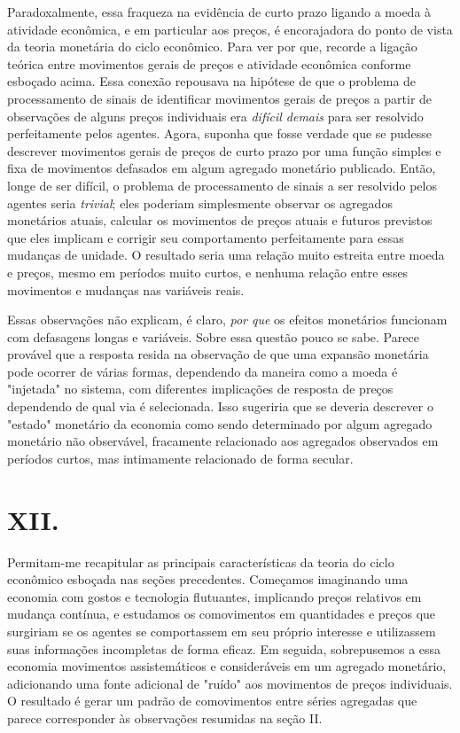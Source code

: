 \documentclass[12pt]{article}
\begin{document}
Paradoxalmente, essa fraqueza na evidência de curto prazo ligando a moeda à atividade econômica, e em particular aos preços, é encorajadora do ponto de vista da teoria monetária do ciclo econômico. Para ver por que, recorde a ligação teórica entre movimentos gerais de preços e atividade econômica conforme esboçado acima. Essa conexão repousava na hipótese de que o problema de processamento de sinais de identificar movimentos gerais de preços a partir de observações de alguns preços individuais era \textit{difícil demais} para ser resolvido perfeitamente pelos agentes. Agora, suponha que fosse verdade que se pudesse descrever movimentos gerais de preços de curto prazo por uma função simples e fixa de movimentos defasados em algum agregado monetário publicado. Então, longe de ser difícil, o problema de processamento de sinais a ser resolvido pelos agentes seria \textit{trivial}; eles poderiam simplesmente observar os agregados monetários atuais, calcular os movimentos de preços atuais e futuros previstos que eles implicam e corrigir seu comportamento perfeitamente para essas mudanças de unidade. O resultado seria uma relação muito estreita entre moeda e preços, mesmo em períodos muito curtos, e nenhuma relação entre esses movimentos e mudanças nas variáveis reais.

Essas observações não explicam, é claro, \textit{por que} os efeitos monetários funcionam com defasagens longas e variáveis. Sobre essa questão pouco se sabe. Parece provável que a resposta resida na observação de que uma expansão monetária pode ocorrer de várias formas, dependendo da maneira como a moeda é "injetada" no sistema, com diferentes implicações de resposta de preços dependendo de qual via é selecionada. Isso sugeriria que se deveria descrever o "estado" monetário da economia como sendo determinado por algum agregado monetário não observável, fracamente relacionado aos agregados observados em períodos curtos, mas intimamente relacionado de forma secular.

\section*{XII.}

Permitam-me recapitular as principais características da teoria do ciclo econômico esboçada nas seções precedentes. Começamos imaginando uma economia com gostos e tecnologia flutuantes, implicando preços relativos em mudança contínua, e estudamos os comovimentos em quantidades e preços que surgiriam se os agentes se comportassem em seu próprio interesse e utilizassem suas informações incompletas de forma eficaz. Em seguida, sobrepusemos a essa economia movimentos assistemáticos e consideráveis em um agregado monetário, adicionando uma fonte adicional de "ruído" aos movimentos de preços individuais. O resultado é gerar um padrão de comovimentos entre séries agregadas que parece corresponder às observações resumidas na seção II.
\end{document}
